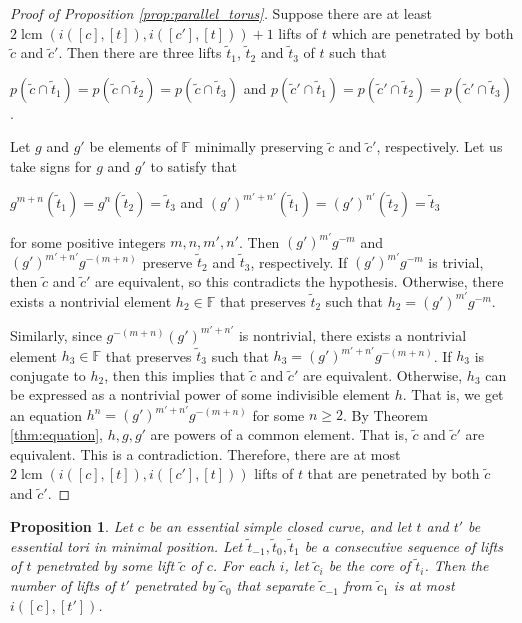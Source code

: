 \documentclass[12pt,a4paper]{amsart}
\numberwithin{equation}{section}
\newcommand{\FF}{\mathbb{F}}
\theoremstyle{plain}
\newtheorem{proposition}[theorem]{Proposition}
\theoremstyle{definition}
\theoremstyle{remark}
\begin{document}
\begin{proof}[Proof of Proposition \ref{prop:parallel_torus}]
    Suppose there are at least $2 \operatorname{lcm}(i([c],[t]), i([c'],[t])) + 1$ lifts of $t$ which are penetrated by both $\tilde{c}$ and $\tilde{c}'$.
    Then there are three lifts $\tilde{t}_1$, $\tilde{t}_2$ and $\tilde{t}_3$ of $t$ such that \begin{center}$p(\tilde{c} \cap \tilde{t}_1) = p(\tilde{c} \cap \tilde{t}_2) = p(\tilde{c} \cap \tilde{t}_3)$ and $p(\tilde{c}' \cap \tilde{t}_1) = p(\tilde{c}' \cap \tilde{t}_2) = p(\tilde{c}' \cap \tilde{t}_3)$.\end{center}

    Let $g$ and $g'$ be elements of $\FF$ minimally preserving $\tilde{c}$ and $\tilde{c}'$, respectively.
    Let us take signs for $g$ and $g'$ to satisfy that \begin{center}$g^{m+n}(\tilde{t}_1) = g^{n}(\tilde{t}_2) = \tilde{t}_3$ and $(g')^{m'+n'}(\tilde{t}_1) = (g')^{n'}(\tilde{t}_2) = \tilde{t}_3$\end{center} for some positive integers $m, n, m', n'$.
    Then $(g')^{m'}g^{-m}$ and $(g')^{m'+n'}g^{-(m+n)}$ preserve $\tilde{t}_2$ and $\tilde{t}_3$, respectively.
    If $(g')^{m'}g^{-m}$ is trivial, then $\tilde{c}$ and $\tilde{c}'$ are equivalent, so this contradicts the hypothesis.
    Otherwise, there exists a nontrivial element $h_2 \in \FF$ that preserves $\tilde{t}_2$ such that $h_2 = (g')^{m'}g^{-m}$.

    Similarly, since $g^{-(m+n)}(g')^{m'+n'}$ is nontrivial, there exists a nontrivial element $h_3 \in \FF$ that preserves $\tilde{t}_3$ such that $h_3 = (g')^{m'+n'}g^{-(m+n)}$.
    If $h_3$ is conjugate to $h_2$, then this implies that $\tilde{c}$ and $\tilde{c}'$ are equivalent.
    Otherwise, $h_3$ can be expressed as a nontrivial power of some indivisible element $h$.
    That is, we get an equation $h^n = (g')^{m'+n'}g^{-(m+n)}$ for some $n \geq 2$.
    By Theorem \ref{thm:equation}, $h, g, g'$ are powers of a common element.
    That is, $\tilde{c}$ and $\tilde{c}'$ are equivalent.
    This is a contradiction.
    Therefore, there are at most $2 \operatorname{lcm}(i([c],[t]), i([c'],[t]))$ lifts of $t$ that are penetrated by both $\tilde{c}$ and $\tilde{c}'$.
\end{proof}

\begin{proposition} \label{prop:between}
    Let $c$ be an essential simple closed curve, and let $t$ and $t'$ be essential tori in minimal position.
    Let $\tilde{t}_{-1}, \tilde{t}_0, \tilde{t}_1$ be a consecutive sequence of lifts of $t$ penetrated by some lift $\tilde{c}$ of $c$.
    For each $i$, let $\tilde{c}_i$ be the core of $\tilde{t}_i$.
    Then the number of lifts of $t'$ penetrated by $\tilde{c}_0$ that separate $\tilde{c}_{-1}$ from $\tilde{c}_1$ is at most $i([c], [t'])$.
\end{proposition}
\end{document}
